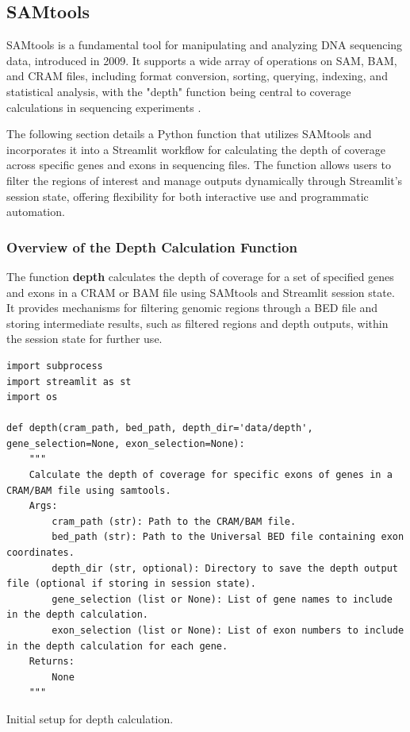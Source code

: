 \subsection{SAMtools}

SAMtools is a fundamental tool for manipulating and analyzing DNA sequencing data, introduced in 2009. It supports a wide array of operations on SAM, BAM, and CRAM files, including format conversion, sorting, querying, indexing, and statistical analysis, with the "depth" function being central to coverage calculations in sequencing experiments \cite{samtools}.

The following section details a Python function that utilizes SAMtools and incorporates it into a Streamlit workflow for calculating the depth of coverage across specific genes and exons in sequencing files. The function allows users to filter the regions of interest and manage outputs dynamically through Streamlit's session state, offering flexibility for both interactive use and programmatic automation.

\subsubsection{\textbf{Overview of the Depth Calculation Function}}

The function \textbf{depth} calculates the depth of coverage for a set of specified genes and exons in a CRAM or BAM file using SAMtools and Streamlit session state. It provides mechanisms for filtering genomic regions through a BED file and storing intermediate results, such as filtered regions and depth outputs, within the session state for further use.

\begin{longlisting}
\begin{verbatim}
import subprocess
import streamlit as st
import os

def depth(cram_path, bed_path, depth_dir='data/depth', gene_selection=None, exon_selection=None):
    """
    Calculate the depth of coverage for specific exons of genes in a CRAM/BAM file using samtools.
    Args:
        cram_path (str): Path to the CRAM/BAM file.
        bed_path (str): Path to the Universal BED file containing exon coordinates.
        depth_dir (str, optional): Directory to save the depth output file (optional if storing in session state).
        gene_selection (list or None): List of gene names to include in the depth calculation.
        exon_selection (list or None): List of exon numbers to include in the depth calculation for each gene.
    Returns:
        None
    """

\end{verbatim}
\caption{Initial setup for depth calculation.}
\label{lbl:samtools1}
\end{longlisting}

